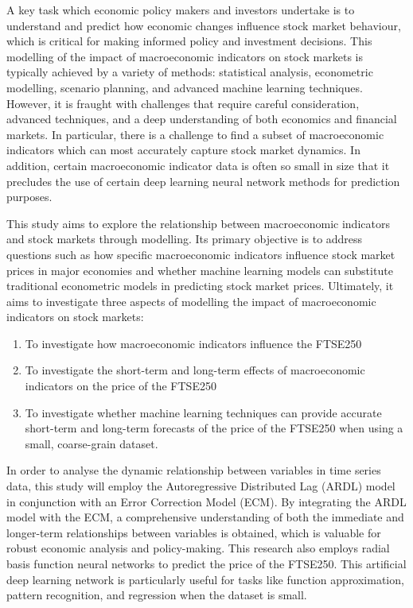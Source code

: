 \documentclass[11pt,a4paper]{article}
\begin{document}
A key task which economic policy makers and investors undertake is to 
understand and predict how economic changes influence stock market behaviour, 
which is critical for making informed policy and investment decisions. 
This modelling of the impact of macroeconomic indicators on stock markets is typically achieved by a variety of methods: statistical analysis, econometric modelling, scenario planning, and advanced machine learning techniques. However, it is fraught with challenges that require careful consideration, advanced techniques, and a deep understanding of both economics and financial markets. In particular, there is a challenge to find a subset of macroeconomic indicators which can most accurately capture stock market dynamics. 
In addition, certain macroeconomic indicator data is often so small in size that it precludes the use of certain deep learning neural network methods for prediction purposes.


This study aims to explore the relationship between macroeconomic indicators and stock markets 
through modelling. Its primary objective is to address questions such as how specific 
macroeconomic indicators influence stock market prices in major economies and whether machine 
learning models can substitute traditional econometric models in predicting stock market prices. 
Ultimately, it aims to investigate three aspects of modelling the impact of macroeconomic 
indicators on stock markets: 
\begin{enumerate}
    \item To investigate how macroeconomic indicators influence the FTSE250
    \item To investigate the short-term and long-term effects of macroeconomic indicators on the price of the FTSE250 
    \item To investigate whether machine learning techniques can provide accurate short-term and long-term forecasts of the price of the FTSE250 when using a small, coarse-grain dataset.
   
\end{enumerate}

In order to analyse the dynamic relationship between variables in time series data, this study will employ the Autoregressive Distributed Lag (ARDL) model in conjunction with an Error Correction Model (ECM). By integrating the ARDL model with the ECM, a comprehensive understanding of both the immediate and longer-term relationships between variables is obtained, which is valuable for robust economic analysis and policy-making.
This research also employs radial basis function neural networks to predict the price of the FTSE250. This artificial deep learning network is particularly useful for tasks like function approximation, pattern recognition, and regression when the dataset is small.
\end{document}

